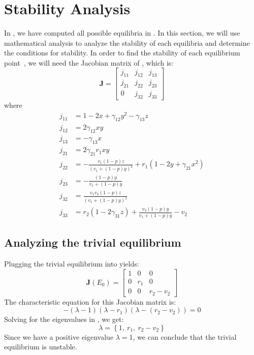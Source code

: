 \chapter{Stability Analysis}\label{chapter:stability_analysis}
In , we have computed all possible equilibria in . In this section, we will use mathematical analysis to analyze the stability of each equilibria and determine the conditions for stability. In order to find the stability of each equilibrium point~\cite{book:2478639}, we will need the Jacobian matrix of , which is:
\begin{equation}
    \textbf{J}=\begin{bmatrix}
        j_{11} & j_{12} & j_{13}\\
        j_{21} & j_{22} & j_{23}\\
        0 & j_{32} & j_{33}
    \end{bmatrix}
    \label{eq:5.1}
\end{equation}
where
\begin{align*}
    j_{11} &= 1-2x+\gamma_{12}y^2-\gamma_{13}z\\
    j_{12} &= 2\gamma_{12}xy\\
    j_{13} &= -\gamma_{13}x\\
    j_{21} &= 2\gamma_{21}r_1xy\\
    j_{22} &= -\frac{v_1\left(1-p\right)z}{\left(v_1+\left(1-p\right)y\right)^2}+r_1\left(1-2y+\gamma_{21}x^2\right)\\
    j_{23} &= -\frac{\left(1-p\right)y}{v_1+\left(1-p\right)y}\\
    j_{32} &= \frac{v_1v_3\left(1-p\right)z}{\left(v_1+\left(1-p\right)y\right)^2}\\
    j_{33} &= r_2\left(1-2\gamma_{31}z\right)+\frac{v_3\left(1-p\right)y}{v_1+\left(1-p\right)y}-v_2
\end{align*}

\section{Analyzing the trivial equilibrium}\label{sec:stability_trivial_equilibrium}
Plugging the trivial equilibrium into  yields:
\begin{equation}
    \textbf{J}\left(E_0\right)=\begin{bmatrix}
        1 & 0 & 0\\
        0 & r_1 & 0\\
        0 & 0 & r_2-v_2
    \end{bmatrix}
    \label{eq:5.2}
\end{equation}
The characteristic equation for this Jacobian matrix is:
\begin{equation}
    -\left(\lambda-1\right)\left(\lambda-r_1\right)\left(\lambda-\left(r_2-v_2\right)\right)=0
    \label{eq:5.3}
\end{equation}
Solving for the eigenvalues in , we get:
\[
\lambda=\left\{
1,\
r_1,\
r_2-v_2
\right\}
\]
Since we have a positive eigenvalue $\lambda=1$, we can conclude that the trivial equilibrium is unstable.

